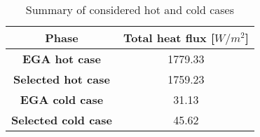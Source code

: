

\begin{table}[H]
    \renewcommand{\arraystretch}{1.7}
    \centering
    \begin{tabularx}{\linewidth}{|c|c|}
        \hline
        \textbf{Phase} & \textbf{Total heat flux [\textbf{$W/
        m^2$}]}  \\
        \hline
        \hline
        \textbf{EGA hot case} & 1779.33 \\ 
        \hline
        \textbf{Selected hot case } & 1759.23 \\
        \hline
        \textbf{EGA cold case} & 31.13 \\
        \hline
        \textbf{Selected cold case} & 45.62 \\
        \hline
    \end{tabularx}
    \caption{Summary of considered hot and cold cases}
    \label{table:cases}
\end{table}